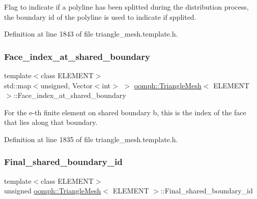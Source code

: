 Flag to indicate if a polyline has been splitted during the distribution process, the boundary id of the polyline is used to indicate if spplited. 



Definition at line 1843 of file triangle\+\_\+mesh.\+template.\+h.

\mbox{\label{classoomph_1_1TriangleMesh_a47e462ebe20246557b6e68623942670b}} 
\subsubsection{\texorpdfstring{Face\+\_\+index\+\_\+at\+\_\+shared\+\_\+boundary}{Face\_index\_at\_shared\_boundary}}
{\footnotesize\ttfamily template$<$class E\+L\+E\+M\+E\+NT$>$ \\
std\+::map$<$unsigned, Vector$<$int$>$ $>$ \hyperlink{classoomph_1_1TriangleMesh}{oomph\+::\+Triangle\+Mesh}$<$ E\+L\+E\+M\+E\+NT $>$\+::Face\+\_\+index\+\_\+at\+\_\+shared\+\_\+boundary\hspace{0.3cm}{\ttfamily [protected]}}



For the e-\/th finite element on shared boundary b, this is the index of the face that lies along that boundary. 



Definition at line 1835 of file triangle\+\_\+mesh.\+template.\+h.

\mbox{\label{classoomph_1_1TriangleMesh_abb552c8115f5e4aea9138379a0523493}} 
\subsubsection{\texorpdfstring{Final\+\_\+shared\+\_\+boundary\+\_\+id}{Final\_shared\_boundary\_id}}
{\footnotesize\ttfamily template$<$class E\+L\+E\+M\+E\+NT$>$ \\
unsigned \hyperlink{classoomph_1_1TriangleMesh}{oomph\+::\+Triangle\+Mesh}$<$ E\+L\+E\+M\+E\+NT $>$\+::Final\+\_\+shared\+\_\+boundary\+\_\+id\hspace{0.3cm}{\ttfamily [protected]}}



